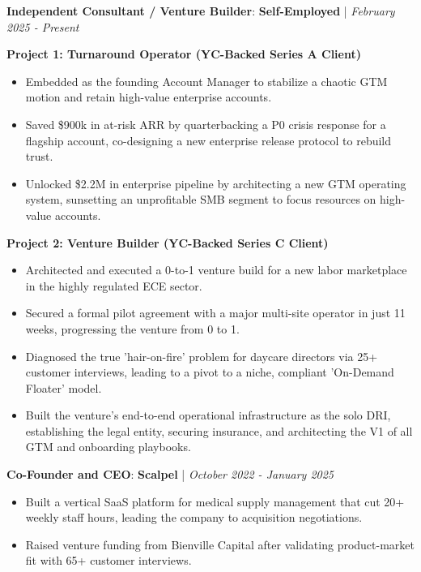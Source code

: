 \documentclass[10pt,a4paper,withhyper]{altacv}
\newcommand{\atscvevent}[4]{%
  \textbf{#1}: \textbf{\textcolor{accent}{#2}} | \textit{#3}%
  \vspace{0.3em}%
}
\begin{document}


\makecvheader


\atscvevent{Independent Consultant / Venture Builder}{Self-Employed}{February 2025 - Present}{}

\textbf{Project 1: Turnaround Operator (YC-Backed Series A Client)}
\begin{itemize}
\item Embedded as the founding Account Manager to stabilize a chaotic GTM motion and retain high-value enterprise accounts.
\item Saved \$900k in at-risk ARR by quarterbacking a P0 crisis response for a flagship account, co-designing a new enterprise release protocol to rebuild trust.
\item Unlocked \$2.2M in enterprise pipeline by architecting a new GTM operating system, sunsetting an unprofitable SMB segment to focus resources on high-value accounts.
\end{itemize}

\textbf{Project 2: Venture Builder (YC-Backed Series C Client)}
\begin{itemize}
\item Architected and executed a 0-to-1 venture build for a new labor marketplace in the highly regulated ECE sector.
\item Secured a formal pilot agreement with a major multi-site operator in just 11 weeks, progressing the venture from 0 to 1.
\item Diagnosed the true 'hair-on-fire' problem for daycare directors via 25+ customer interviews, leading to a pivot to a niche, compliant 'On-Demand Floater' model.
\item Built the venture's end-to-end operational infrastructure as the solo DRI, establishing the legal entity, securing insurance, and architecting the V1 of all GTM and onboarding playbooks.
\end{itemize}

\atscvevent{Co-Founder and CEO}{Scalpel}{October 2022 - January 2025}{}
\begin{itemize}
\item Built a vertical SaaS platform for medical supply management that cut 20+ weekly staff hours, leading the company to acquisition negotiations.
\item Raised venture funding from Bienville Capital after validating product-market fit with 65+ customer interviews.
\end{itemize}
\end{document}
